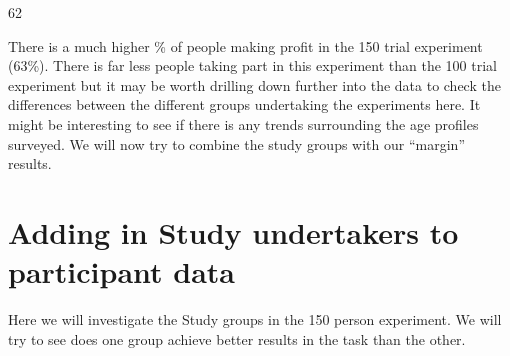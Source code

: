 \documentclass[letterpaper,10pt,english]{jupyterBook}
\begin{document}
\begin{sphinxVerbatim}[commandchars=\\\{\}]
62
\end{sphinxVerbatim}

\sphinxAtStartPar
There is a much higher \% of people making profit in the 150 trial experiment (63\%). There is far less people taking part in this experiment than the 100 trial experiment but it may be worth drilling down further into the data to check the differences between the different groups undertaking the experiments here. It might be interesting to see if there is any trends surrounding the age profiles surveyed. We will now try to combine the study groups with our “margin” results.


\section{Adding in Study undertakers to participant data}
\label{\detokenize{data-analysis:adding-in-study-undertakers-to-participant-data}}
\begin{sphinxVerbatim}[commandchars=\\\{\}]
\PYG{p}{[}\PYG{p}{]}  \PYG{p}{[}\PYG{p}{]}
\end{sphinxVerbatim}

\begin{sphinxVerbatim}[commandchars=\\\{\}]
\PYG{p}{[}\PYG{p}{]}  \PYG{p}{[}\PYG{p}{]}
\end{sphinxVerbatim}

\begin{sphinxVerbatim}[commandchars=\\\{\}]
\PYG{p}{[}\PYG{p}{]}  \PYG{p}{[}\PYG{p}{]}
\end{sphinxVerbatim}

\sphinxAtStartPar
Here we will investigate the Study groups in the 150 person experiment. We will try to see does one group achieve better results in the task than the other.
\end{document}
